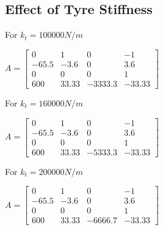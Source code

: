 \documentclass[12pt, a4paper, oneside]{report}
\begin{document}
\subsection{Effect of Tyre Stiffness}


    For $k_t = 100000 N/m$ 

    $A = \begin{bmatrix}
        0     & 1    & 0       & -1      \\
        -65.5 & -3.6 & 0       & 3.6     \\
        0     & 0    & 0       & 1       \\
        600   & 33.33 & -3333.3 & -33.33 
    \end{bmatrix}$\hfill \break

    For $k_t = 160000 N/m$ 

    $A = \begin{bmatrix}
        0     & 1    & 0       & -1      \\
        -65.5 & -3.6 & 0       & 3.6     \\
        0     & 0    & 0       & 1       \\
        600   & 33.33 & -5333.3 & -33.33 
    \end{bmatrix}$\hfill \break

    For $k_t = 200000 N/m$ 

    $A = \begin{bmatrix}
        0     & 1    & 0       & -1      \\
        -65.5 & -3.6 & 0       & 3.6     \\
        0     & 0    & 0       & 1       \\
        600   & 33.33 & -6666.7 & -33.33 
    \end{bmatrix}$\hfill \break
\end{document}
